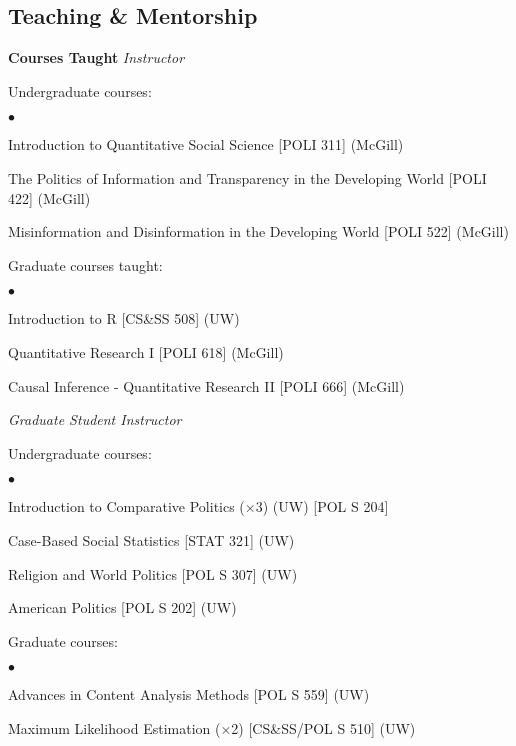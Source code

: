 \documentclass[margin,line]{res}
\newenvironment{list1}{
  \begin{list}{\ding{113}}{%
      \setlength{\itemsep}{0in}
      \setlength{\parsep}{0in} \setlength{\parskip}{0in}
      \setlength{\topsep}{0in} \setlength{\partopsep}{0in} 
      \setlength{\leftmargin}{0.17in}}}{\end{list}}
\newenvironment{list2}{
  \begin{list}{$\bullet$}{%
      \setlength{\itemsep}{0in}
      \setlength{\parsep}{0in} \setlength{\parskip}{0in}
      \setlength{\topsep}{0in} \setlength{\partopsep}{0in} 
      \setlength{\leftmargin}{0.2in}}}{\end{list}}
\begin{document}
{\begin{resume}
\section{\sc Teaching \& Mentorship}
\textbf{Courses Taught}
{\em Instructor}\\
\vspace{-.1in}
\begin{list1}
\item[] Undergraduate courses:
   \begin{list2}
   \item[] Introduction to Quantitative Social Science [POLI 311]
     (McGill)
   \item[] The Politics of Information and Transparency in the
     Developing World [POLI 422] (McGill)
        \item[] Misinformation and Disinformation in the
     Developing World [POLI 522] (McGill)
\end{list2}

 \item[] Graduate courses taught:
   \begin{list2}
   \item[] Introduction to R  [CS\&SS 508] (UW)
   \item[] Quantitative Research  I [POLI 618] (McGill)
      \item[] Causal Inference - Quantitative Research  II [POLI 666] (McGill)

\end{list2}
\end{list1}

{\em Graduate Student Instructor } \\
\vspace{-.1in}
\begin{list1}
 \item[] Undergraduate courses:
   \begin{list2}
   \item[] Introduction to Comparative Politics ($\times$3) (UW)
   [POL S 204]
   \item[] Case-Based Social Statistics [STAT 321] (UW)
   \item[]Religion and World Politics [POL S 307] (UW)
     \item[] American Politics [POL S 202] (UW)
\end{list2}
\item[] Graduate courses:
   \begin{list2}
     \item [] Advances in Content Analysis Methods [POL S 559] (UW)
     \item [] Maximum Likelihood Estimation ($\times$2) [CS\&SS/POL S
       510] (UW)
\end{list2}
\end{list1}


\end{resume}}
\end{document}
